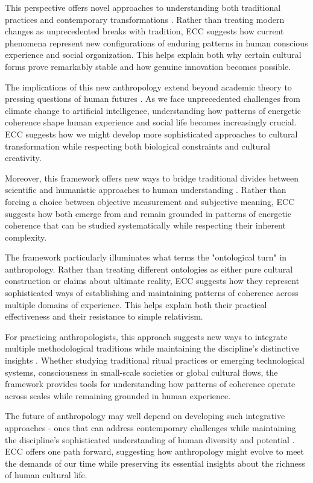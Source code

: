 This perspective offers novel approaches to understanding both traditional practices and contemporary transformations \cite{tsing2015mushroom}. Rather than treating modern changes as unprecedented breaks with tradition, ECC suggests how current phenomena represent new configurations of enduring patterns in human conscious experience and social organization. This helps explain both why certain cultural forms prove remarkably stable and how genuine innovation becomes possible.

The implications of this new anthropology extend beyond academic theory to pressing questions of human futures \cite{haraway2016staying}. As we face unprecedented challenges from climate change to artificial intelligence, understanding how patterns of energetic coherence shape human experience and social life becomes increasingly crucial. ECC suggests how we might develop more sophisticated approaches to cultural transformation while respecting both biological constraints and cultural creativity.

Moreover, this framework offers new ways to bridge traditional divides between scientific and humanistic approaches to human understanding \cite{stengers2018another}. Rather than forcing a choice between objective measurement and subjective meaning, ECC suggests how both emerge from and remain grounded in patterns of energetic coherence that can be studied systematically while respecting their inherent complexity.

The framework particularly illuminates what \cite{bessire2014ontological} terms the "ontological turn" in anthropology. Rather than treating different ontologies as either pure cultural construction or claims about ultimate reality, ECC suggests how they represent sophisticated ways of establishing and maintaining patterns of coherence across multiple domains of experience. This helps explain both their practical effectiveness and their resistance to simple relativism.

For practicing anthropologists, this approach suggests new ways to integrate multiple methodological traditions while maintaining the discipline's distinctive insights \cite{rabinow2008marking}. Whether studying traditional ritual practices or emerging technological systems, consciousness in small-scale societies or global cultural flows, the framework provides tools for understanding how patterns of coherence operate across scales while remaining grounded in human experience.

The future of anthropology may well depend on developing such integrative approaches - ones that can address contemporary challenges while maintaining the discipline's sophisticated understanding of human diversity and potential \cite{ortner2016dark}. ECC offers one path forward, suggesting how anthropology might evolve to meet the demands of our time while preserving its essential insights about the richness of human cultural life.

